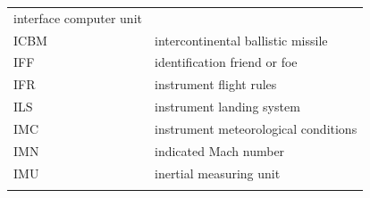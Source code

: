 \documentclass[
]{book}
\begin{document}
\begin{longtable}[]{@{}ll@{}}
\begin{minipage}[t]{0.47\columnwidth}
interface computer unit\strut
\end{minipage}\tabularnewline
\begin{minipage}[t]{0.47\columnwidth}\raggedright
ICBM\strut
\end{minipage} & \begin{minipage}[t]{0.47\columnwidth}\raggedright
intercontinental ballistic missile\strut
\end{minipage}\tabularnewline
\begin{minipage}[t]{0.47\columnwidth}\raggedright
IFF\strut
\end{minipage} & \begin{minipage}[t]{0.47\columnwidth}\raggedright
identification friend or foe\strut
\end{minipage}\tabularnewline
\begin{minipage}[t]{0.47\columnwidth}\raggedright
IFR\strut
\end{minipage} & \begin{minipage}[t]{0.47\columnwidth}\raggedright
instrument flight rules\strut
\end{minipage}\tabularnewline
\begin{minipage}[t]{0.47\columnwidth}\raggedright
ILS\strut
\end{minipage} & \begin{minipage}[t]{0.47\columnwidth}\raggedright
instrument landing system\strut
\end{minipage}\tabularnewline
\begin{minipage}[t]{0.47\columnwidth}\raggedright
IMC\strut
\end{minipage} & \begin{minipage}[t]{0.47\columnwidth}\raggedright
instrument meteorological conditions\strut
\end{minipage}\tabularnewline
\begin{minipage}[t]{0.47\columnwidth}\raggedright
IMN\strut
\end{minipage} & \begin{minipage}[t]{0.47\columnwidth}\raggedright
indicated Mach number\strut
\end{minipage}\tabularnewline
\begin{minipage}[t]{0.47\columnwidth}\raggedright
IMU\strut
\end{minipage} & \begin{minipage}[t]{0.47\columnwidth}\raggedright
inertial measuring unit\strut
\end{minipage}\tabularnewline
\begin{minipage}[t]{0.47\columnwidth}\raggedright

\end{minipage}
\end{longtable}
\end{document}
